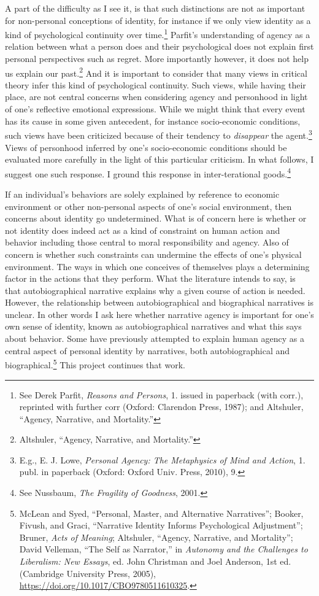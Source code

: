 \documentclass[phdthesis,12pt,final]{wuthesis}
\theoremstyle{definition}
\theoremstyle{definition}
\theoremstyle{definition}
\theoremstyle{definition}
\theoremstyle{remark}
\begin{document}
A part of the difficulty as I see it, is that such distinctions are not as important for non-personal conceptions of identity, for instance if we only view identity as a kind of psychological continuity over time.\footnote{See Derek Parfit, \emph{Reasons and Persons}, 1. issued in paperback (with corr.), reprinted with further corr (Oxford: Clarendon Press, 1987); and Altshuler, {``Agency, Narrative, and Mortality.''}} Parfit's understanding of agency as a relation between what a person does and their psychological does not explain first personal perspectives such as regret. More importantly however, it does not help us explain our past.\footnote{Altshuler, {``Agency, Narrative, and Mortality.''}} And it is important to consider that many views in critical theory infer this kind of psychological continuity. Such views, while having their place, are not central concerns when considering agency and personhood in light of one's reflective emotional expressions. While we might think that every event has its cause in some given antecedent, for instance socio-economic conditions, such views have been criticized because of their tendency to \emph{disappear} the agent.\footnote{E.g., E. J. Lowe, \emph{Personal Agency: The Metaphysics of Mind and Action}, 1. publ. in paperback (Oxford: Oxford Univ. Press, 2010), 9.} Views of personhood inferred by one's socio-economic conditions should be evaluated more carefully in the light of this particular criticism. In what follows, I suggest one such response. I ground this response in inter-terational goods.\footnote{See Nussbaum, \emph{The {Fragility} of {Goodness}}, 2001.}

If an individual's behaviors are solely explained by reference to economic environment or other non-personal aspects of one's social environment, then concerns about identity go undetermined. What is of concern here is whether or not identity does indeed act as a kind of constraint on human action and behavior including those central to moral responsibility and agency. Also of concern is whether such constraints can undermine the effects of one's physical environment. The ways in which one conceives of themselves plays a determining factor in the actions that they perform. What the literature intends to say, is that autobiographical narrative explains why a given course of action is needed. However, the relationship between autobiographical and biographical narratives is unclear. In other words I ask here whether narrative agency is important for one's own sense of identity, known as autobiographical narratives and what this says about behavior. Some have previously attempted to explain human agency as a central aspect of personal identity by narratives, both autobiographical and biographical.\footnote{McLean and Syed, {``Personal, {Master}, and {Alternative Narratives}''}; Booker, Fivush, and Graci, {``Narrative Identity Informs Psychological Adjustment''}; Bruner, \emph{Acts of Meaning}; Altshuler, {``Agency, Narrative, and Mortality''}; David Velleman, {``The {Self} as {Narrator},''} in \emph{Autonomy and the {Challenges} to {Liberalism}: {New Essays}}, ed. John Christman and Joel Anderson, 1st ed. (Cambridge University Press, 2005), \url{https://doi.org/10.1017/CBO9780511610325}.} This project continues that work.
\end{document}
